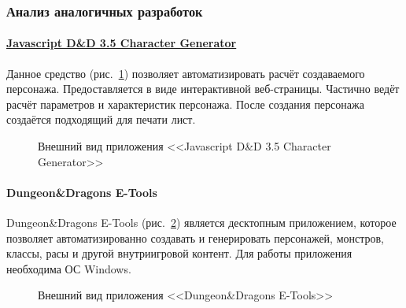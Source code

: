 \subsubsection{Анализ аналогичных разработок}


\paragraph{\href{http://www.pathguy.com/cg35.htm}{Javascript D\&D 3.5 Character Generator}}
Данное средство (рис.~\ref{ris:js_character_generator}) позволяет автоматизировать расчёт создаваемого персонажа. Предоставляется в виде интерактивной веб-страницы. Частично ведёт расчёт параметров и характеристик персонажа. После создания персонажа создаётся подходящий для печати лист.

\begin{figure}[h]
\caption{Внешний вид приложения <<Javascript D\&D 3.5 Character Generator>>}
\label{ris:js_character_generator}
\end{figure}


\paragraph{Dungeon\&Dragons E-Tools}
Dungeon\&Dragons E-Tools (рис.~\ref{ris:dnd_e-tools}) является десктопным приложением, которое позволяет автоматизированно создавать и генерировать персонажей, монстров, классы, расы и другой внутриигровой контент. Для работы приложения необходима ОС Windows.

\begin{figure}[h]
\caption{Внешний вид приложения <<Dungeon\&Dragons E-Tools>>}
\label{ris:dnd_e-tools}
\end{figure}


